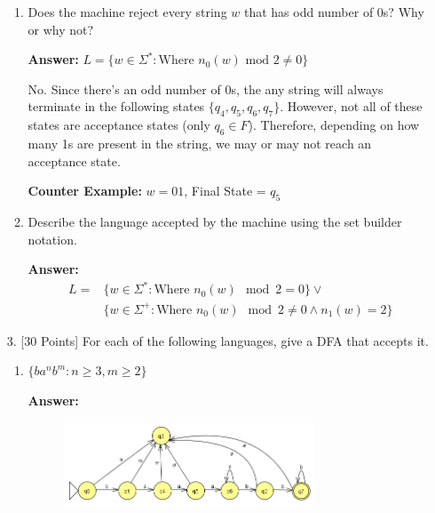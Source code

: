 \documentclass[12pt]{article}
\begin{document}
\begin{enumerate}
\begin{enumerate}
		      \item Does the machine reject every string $w$ that has odd number of 0s? Why or why not?

		            \noindent \textbf{Answer:} $L = \{w \in \Sigma^* : \text{Where $n_0(w)$ mod $2 \neq 0$} \}$

		            No. Since there's an odd number of 0s, the any string will always terminate in the following states $\{q_4, q_5, q_6, q_7 \}$. However, not all of these states are acceptance states (only $q_6 \in F$). Therefore, depending on how many 1s are present in the string, we may or may not reach an acceptance state.

		            \textbf{Counter Example:} $w = 01$, Final State = $q_5$

		      \item Describe the language accepted by the machine using the set builder notation.

		            \noindent \textbf{Answer:}
		            \begin{equation}
			            \begin{split}
				            L = & \{w \in \Sigma^* : \text{Where } n_0(w) \mod 2 = 0 \} \lor \\ & \{w \in \Sigma^+ : \text{Where } n_0(w) \mod 2 \neq 0 \land n_1(w) = 2 \}
			            \end{split}
		            \end{equation}

	      \end{enumerate}

	      \newpage

	\item[3.] [30 Points] For each of the following languages, give a DFA that accepts it.

	      \begin{enumerate}
		      \item $\{ba^nb^m : n \geq 3, m \geq 2 \}$

		            \noindent \textbf{Answer:}

		            \begin{figure}[h!]
			            \centering
			            \includegraphics[width=0.75\textwidth]{img/q3/q3_a.png}
		            \end{figure}


\end{enumerate}
\end{enumerate}
\end{document}
